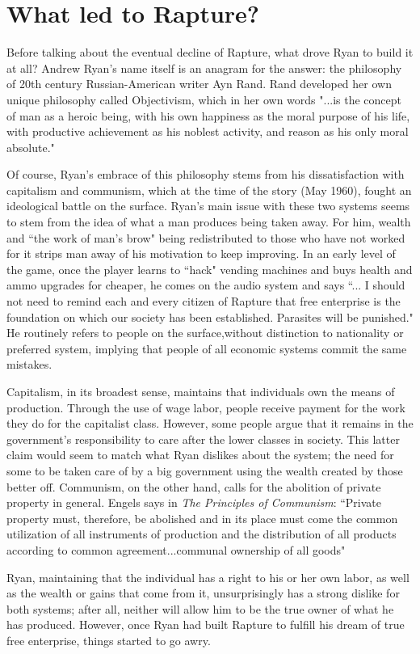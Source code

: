 \documentclass{article}
\begin{document}
\section{What led to Rapture?}
Before talking about the eventual decline of Rapture, what drove Ryan to build it at all? Andrew Ryan's name
itself is an anagram for the answer: the philosophy of 20th century Russian-American writer Ayn Rand. Rand 
developed her own unique philosophy called Objectivism, which in her own words "...is the concept of man
as a heroic being, with his own happiness as the moral purpose of his life, with productive achievement as
his noblest activity, and reason as his only moral absolute."\textcite{AtlasShrugged}

Of course, Ryan's embrace of this philosophy stems from his dissatisfaction with capitalism and communism,
which at the time of the story (May 1960), fought an ideological battle on the surface. Ryan's 
main issue with these two systems seems to stem from the idea of what a man produces being taken away. For 
him, wealth and ``the work of man's brow" being redistributed to those who have not worked for it strips man
away of his motivation to keep improving. In an early level of the game, once the player learns to ``hack"
vending machines and buys health and ammo upgrades for cheaper, he comes on the audio system and says ``...
I should not need to remind each and every citizen of Rapture that free enterprise is the foundation on which
our society has been established. Parasites will be punished."\textcite{Bioshock} He routinely refers to 
people on the surface,without distinction to nationality or preferred system, implying that people 
of all economic systems commit the same mistakes.

Capitalism, in its broadest sense, maintains that individuals own the means of production. Through the use of
wage labor, people receive payment for the work they do for the capitalist class. \textcite{ComparingEconomics}
However, some people argue that it remains in the government's responsibility to care after the lower classes in
society.  This latter claim would seem to match what Ryan dislikes about the system; the need for some to be 
taken care of by a big government using the wealth created by those better off. Communism, on the other hand,
calls for the abolition of private property in general. Engels says in \textit{The Principles of Communism}:
``Private property must, therefore, be abolished and in its place must come the common utilization of all 
instruments of production and the distribution of all products according to common agreement...communal
ownership of all goods"\textcite{PrinciplesOfCommunism}

Ryan, maintaining that the individual has a right to his or her own labor, as well as the wealth or gains that 
come from it, unsurprisingly has a strong dislike for both systems; after all, neither will allow him to 
be the true owner of what he has produced. However, once Ryan had built Rapture to fulfill his dream of 
true free enterprise, things started to go awry. 
\printbibliography
\end{document}
